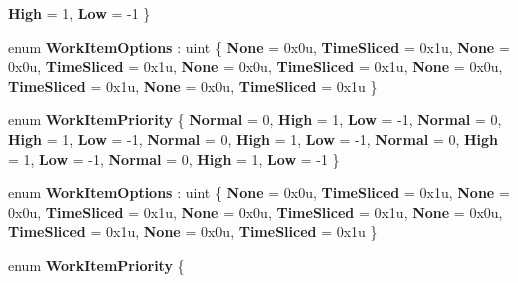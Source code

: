 \begin{DoxyCompactItemize}
{\bfseries High} = 1, 
{\bfseries Low} = -\/1
 \}
\item 
\mbox{\label{namespace_windows_1_1_system_1_1_threading_a94947e61a137a08a7882cdb6eb9afa18}} 
enum {\bfseries Work\+Item\+Options} \+: uint \{ \newline
{\bfseries None} = 0x0u, 
{\bfseries Time\+Sliced} = 0x1u, 
{\bfseries None} = 0x0u, 
{\bfseries Time\+Sliced} = 0x1u, 
\newline
{\bfseries None} = 0x0u, 
{\bfseries Time\+Sliced} = 0x1u, 
{\bfseries None} = 0x0u, 
{\bfseries Time\+Sliced} = 0x1u, 
\newline
{\bfseries None} = 0x0u, 
{\bfseries Time\+Sliced} = 0x1u
 \}
\item 
\mbox{\label{namespace_windows_1_1_system_1_1_threading_a6d436d8ad69b6001b82160043badf06a}} 
enum {\bfseries Work\+Item\+Priority} \{ \newline
{\bfseries Normal} = 0, 
{\bfseries High} = 1, 
{\bfseries Low} = -\/1, 
{\bfseries Normal} = 0, 
\newline
{\bfseries High} = 1, 
{\bfseries Low} = -\/1, 
{\bfseries Normal} = 0, 
{\bfseries High} = 1, 
\newline
{\bfseries Low} = -\/1, 
{\bfseries Normal} = 0, 
{\bfseries High} = 1, 
{\bfseries Low} = -\/1, 
\newline
{\bfseries Normal} = 0, 
{\bfseries High} = 1, 
{\bfseries Low} = -\/1
 \}
\item 
\mbox{\label{namespace_windows_1_1_system_1_1_threading_a94947e61a137a08a7882cdb6eb9afa18}} 
enum {\bfseries Work\+Item\+Options} \+: uint \{ \newline
{\bfseries None} = 0x0u, 
{\bfseries Time\+Sliced} = 0x1u, 
{\bfseries None} = 0x0u, 
{\bfseries Time\+Sliced} = 0x1u, 
\newline
{\bfseries None} = 0x0u, 
{\bfseries Time\+Sliced} = 0x1u, 
{\bfseries None} = 0x0u, 
{\bfseries Time\+Sliced} = 0x1u, 
\newline
{\bfseries None} = 0x0u, 
{\bfseries Time\+Sliced} = 0x1u
 \}
\item 
\mbox{\label{namespace_windows_1_1_system_1_1_threading_a6d436d8ad69b6001b82160043badf06a}} 
enum {\bfseries Work\+Item\+Priority} \{ \newline

\end{DoxyCompactItemize}
